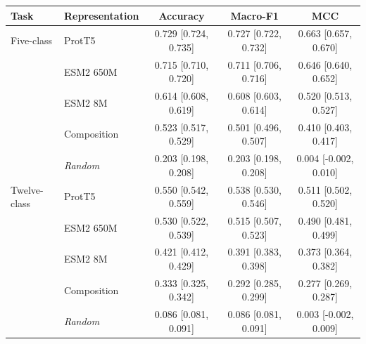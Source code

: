 \begin{tabular}{llccc}
\hline
\textbf{Task} & \textbf{Representation} & \textbf{Accuracy} & \textbf{Macro-F1} & \textbf{MCC} \\
\hline
Five-class & ProtT5 & 0.729 {\scriptsize[0.724, 0.735]} & 0.727 {\scriptsize[0.722, 0.732]} & 0.663 {\scriptsize[0.657, 0.670]} \\
 & ESM2 650M & 0.715 {\scriptsize[0.710, 0.720]} & 0.711 {\scriptsize[0.706, 0.716]} & 0.646 {\scriptsize[0.640, 0.652]} \\
 & ESM2 8M & 0.614 {\scriptsize[0.608, 0.619]} & 0.608 {\scriptsize[0.603, 0.614]} & 0.520 {\scriptsize[0.513, 0.527]} \\
 & Composition & 0.523 {\scriptsize[0.517, 0.529]} & 0.501 {\scriptsize[0.496, 0.507]} & 0.410 {\scriptsize[0.403, 0.417]} \\
 & \textit{Random} & 0.203 {\scriptsize[0.198, 0.208]} & 0.203 {\scriptsize[0.198, 0.208]} & 0.004 {\scriptsize[-0.002, 0.010]} \\
\hline
Twelve-class & ProtT5 & 0.550 {\scriptsize[0.542, 0.559]} & 0.538 {\scriptsize[0.530, 0.546]} & 0.511 {\scriptsize[0.502, 0.520]} \\
 & ESM2 650M & 0.530 {\scriptsize[0.522, 0.539]} & 0.515 {\scriptsize[0.507, 0.523]} & 0.490 {\scriptsize[0.481, 0.499]} \\
 & ESM2 8M & 0.421 {\scriptsize[0.412, 0.429]} & 0.391 {\scriptsize[0.383, 0.398]} & 0.373 {\scriptsize[0.364, 0.382]} \\
 & Composition & 0.333 {\scriptsize[0.325, 0.342]} & 0.292 {\scriptsize[0.285, 0.299]} & 0.277 {\scriptsize[0.269, 0.287]} \\
 & \textit{Random} & 0.086 {\scriptsize[0.081, 0.091]} & 0.086 {\scriptsize[0.081, 0.091]} & 0.003 {\scriptsize[-0.002, 0.009]} \\
\hline
\end{tabular}
